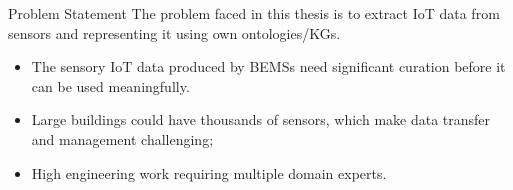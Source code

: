 \begin{tframe}{Problem Statement}
The problem faced in this thesis is to extract IoT data from sensors and representing it using own ontologies/KGs.
\vspace{.5cm}
\begin{itemize}
    \item The sensory IoT data produced by BEMSs need significant curation before it can be used meaningfully.
    \item Large buildings could have thousands of sensors, which make data transfer and management challenging; %
    \item High engineering work requiring multiple domain experts.
\end{itemize}
\end{tframe}